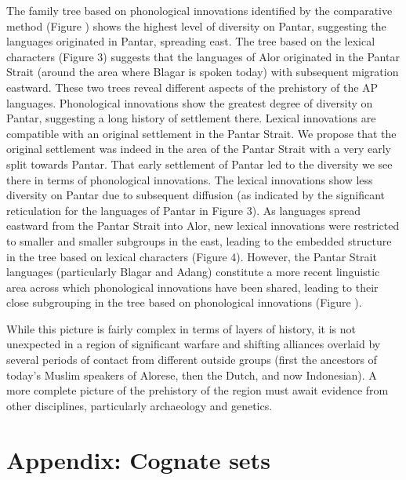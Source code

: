 The family tree based on phonological innovations identified by the comparative method (Figure ) shows the highest level of diversity on Pantar, suggesting the languages originated in Pantar, spreading east. The tree based on the lexical characters (Figure 3) suggests that the languages of Alor originated in the Pantar Strait (around the area where Blagar is spoken today) with subsequent migration eastward. These two trees reveal different aspects of the prehistory of the AP languages. Phonological innovations show the greatest degree of diversity on Pantar, suggesting a long history of settlement there. Lexical innovations are compatible with an original settlement in the Pantar Strait. We propose that the original settlement was indeed in the area of the Pantar Strait with a very early split towards Pantar. That early settlement of Pantar led to the diversity we see there in terms of phonological innovations. The lexical innovations show less diversity on Pantar due to subsequent diffusion (as indicated by
the significant reticulation for the languages of Pantar in Figure 3). As languages spread eastward from the Pantar Strait into Alor, new lexical innovations were restricted to smaller and smaller subgroups in the east, leading to the embedded structure in the tree based on lexical characters (Figure 4). However, the Pantar Strait languages (particularly Blagar and Adang) constitute a more recent linguistic area across which phonological innovations have been shared, leading to their close subgrouping in the tree based on phonological innovations (Figure ).

While this picture is fairly complex in terms of layers of history, it is not unexpected in a region of significant warfare and shifting alliances overlaid by several periods of contact from different outside groups (first the ancestors of today's Muslim speakers of Alorese, then the Dutch, and now Indonesian). A more complete picture of the prehistory of the region must await evidence from other disciplines, particularly archaeology and genetics.

\section{Appendix: Cognate sets}

